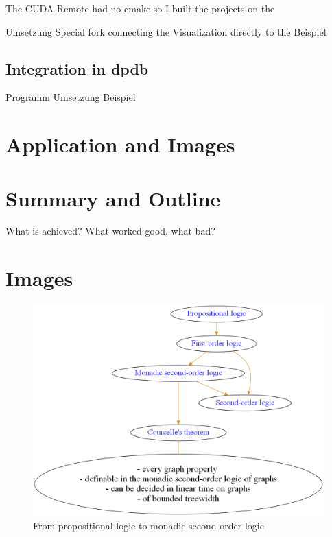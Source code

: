 \documentclass[a4paper, 12pt]{scrartcl}
\begin{document}
The CUDA Remote had no cmake so I built the projects on the 

Umsetzung Special fork connecting the Visualization directly to the 
Beispiel
\newpage
\subsection{Integration in dpdb}
Programm
Umsetzung
Beispiel

\newpage
\section{Application and Images }

\newpage
\section{Summary and Outline}
What is achieved?
What worked good, what bad?
{}


\newpage
\appendix
\section{Images}
\begin{figure}[H]
	\centering
	\includegraphics[width=0.8\linewidth]{images/logictheory.png}
	\caption{From propositional logic to monadic second order logic}
	\label{fig:logictheory}
\end{figure}
\end{document}
